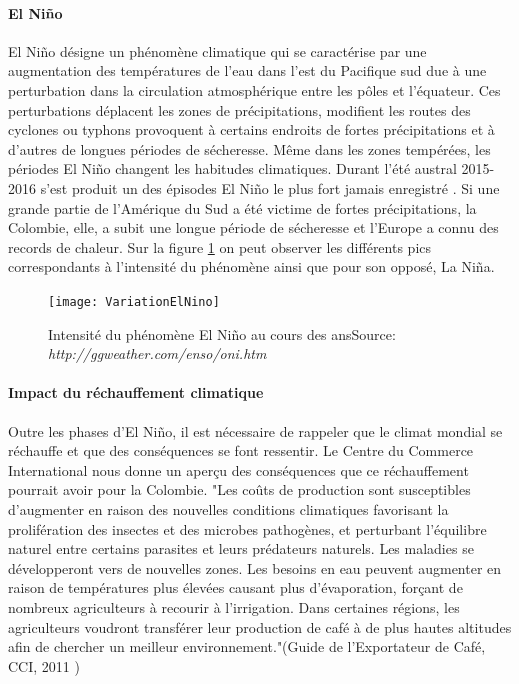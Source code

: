 \paragraph{El Niño}El Niño désigne un phénomène climatique qui se caractérise par une augmentation des températures de l'eau dans l'est du Pacifique sud due à une perturbation dans la circulation atmosphérique entre les pôles et l'équateur. Ces perturbations déplacent les zones de précipitations, modifient les routes des cyclones ou typhons provoquent à certains endroits de fortes précipitations et à d'autres de longues périodes de sécheresse. Même dans les zones tempérées, les périodes El Niño changent les habitudes climatiques. Durant l'été austral 2015-2016 s'est produit un des épisodes El Niño le plus fort jamais enregistré\cite{OMM} \cite{actulatino_2016}. Si une grande partie de l'Amérique du Sud a été victime de fortes précipitations, la Colombie, elle, a subit une longue période de sécheresse et l'Europe a connu des records de chaleur. Sur la figure \ref{Nino} on peut observer les différents pics correspondants à l'intensité du phénomène ainsi que pour son opposé, La Niña. 

\begin{figure}[H]
	\centering
	\texttt{[image: VariationElNino]}
	\caption{\label{Nino} Intensité du phénomène El Niño au cours des ans\newline Source: \textit{http://ggweather.com/enso/oni.htm}}
\end{figure}

\paragraph{Impact du réchauffement climatique} Outre les phases d'El Niño, il est nécessaire de rappeler que le climat mondial se réchauffe et que des conséquences se font ressentir. Le Centre du Commerce International \cite{CCI} nous donne un aperçu des conséquences que ce réchauffement pourrait avoir pour la Colombie. "Les coûts de production sont susceptibles d'augmenter en raison des nouvelles conditions climatiques favorisant la prolifération des insectes et des microbes pathogènes, et perturbant l'équilibre naturel entre certains parasites et leurs prédateurs naturels. Les maladies se développeront vers de nouvelles zones. Les besoins en eau peuvent augmenter en raison de températures plus élevées causant plus d'évaporation, forçant de nombreux agriculteurs à recourir à l'irrigation. Dans certaines régions, les agriculteurs voudront transférer leur production de café à de plus hautes altitudes afin de chercher un meilleur environnement."(Guide de l'Exportateur de Café, CCI, 2011 \cite{GuideCafe})


